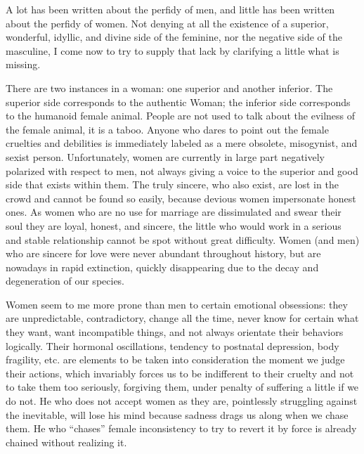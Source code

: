 
\par A lot has been written about the perfidy of men, and little has been written about the perfidy of women. Not denying at all the existence of a superior, wonderful, idyllic, and divine side of the feminine, nor the negative side of the masculine, I come now to try to supply that lack by clarifying a little what is missing.

\par There are two instances in a woman: one superior and another inferior. The superior side corresponds to the authentic Woman; the inferior side corresponds to the humanoid female animal. People are not used to talk about the evilness of the female animal, it is a taboo. Anyone who dares to point out the female cruelties and debilities is immediately labeled as a mere obsolete, misogynist, and sexist person. Unfortunately, women are currently in large part negatively polarized with respect to men, not always giving a voice to the superior and good side that exists within them. The truly sincere, who also exist, are lost in the crowd and cannot be found so easily, because devious women impersonate honest ones\footnotemark[1]. As women who are no use for marriage are dissimulated and swear their soul they are loyal, honest, and sincere, the little who would work in a serious and stable relationship cannot be spot without great difficulty. Women (and men) who are sincere for love were never abundant throughout history, but are nowadays in rapid extinction, quickly disappearing due to the decay and degeneration of our species\footnotemark[2].



\par Women seem to me more prone than men to certain emotional obsessions: they are unpredictable, contradictory, change all the time, never know for certain what they want, want incompatible things, and not always orientate their behaviors logically\footnotemark[3]. Their hormonal oscillations, tendency to postnatal depression, body fragility, etc. are elements to be taken into consideration the moment we judge their actions, which invariably forces us to be indifferent to their cruelty and not to take them too seriously, forgiving them, under penalty of suffering a little if we do not. He who does not accept women as they are, pointlessly struggling against the inevitable, will lose his mind because sadness drags us along when we chase them. He who \enquote{chases} female inconsistency to try to revert it by force is already chained without realizing it.

